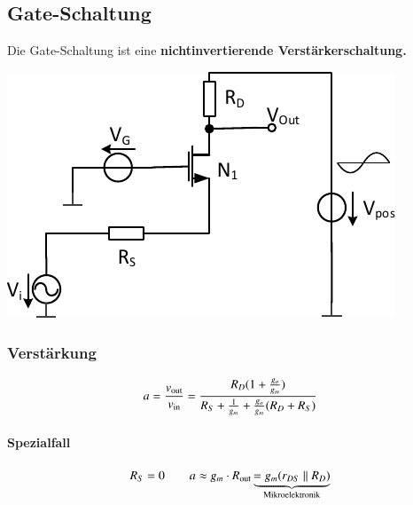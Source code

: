 \subsection{Gate-Schaltung}

Die Gate-Schaltung ist eine \textbf{nichtinvertierende Verstärkerschaltung.}

\smallskip

\begin{minipage}[t]{0.4\columnwidth}
    \includegraphics[width=\columnwidth, align=t]{images/03_gate_schaltung.pdf}
\end{minipage}
\hfill
\begin{minipage}[t]{0.58\columnwidth}
    \subsubsection{Verstärkung}

    \vspace{-0.2cm}

    \[
        a = \frac{v_{\rm out}}{v_{\rm in}} = \frac{R_D (1+\frac{g_o}{g_m})}{R_S + \frac{1}{g_m} + \frac{g_o}{g_m} (R_D + R_S)}
    \]

    \paragraph{Spezialfall}
    
    \vspace{-0.3cm}

    \[
        R_S = 0 \qquad  a \approx g_m \cdot R_{\rm out} \underbrace{= g_m (r_{DS} \parallel R_D) }_{\text{Mikroelektronik}} 
    \]
\end{minipage}

\smallskip

